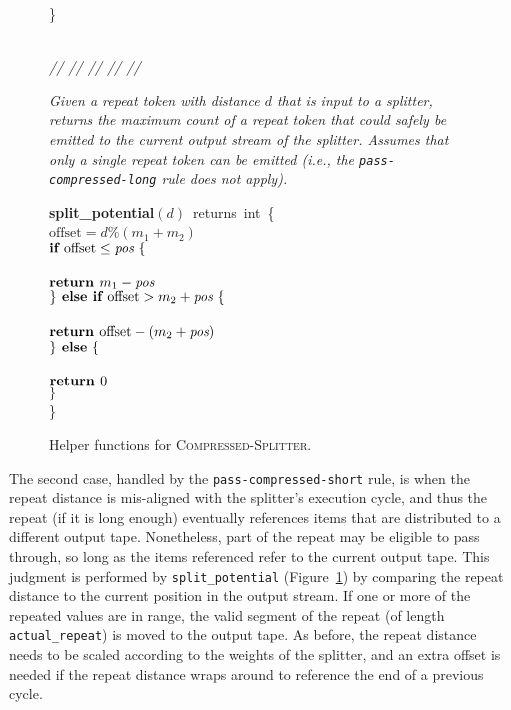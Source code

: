 \begin{figure}[t]
\}\\
~ \\
\begin{minipage}{0.1in}
\vspace{-1.75pt}
{\it // // // // //}
\end{minipage}
\begin{minipage}{3.23in}
{\it Given a repeat token with distance $d$ that is input to a
  splitter, returns the maximum count of a repeat token that could
  safely be emitted to the current output stream of the splitter.
  Assumes that only a single repeat token can be emitted (i.e., the
  {\tt pass-compressed-long} rule does not apply).}
\end{minipage}
\mbox{\bf split\_potential}$(d)$~returns~int~\{\\
\tab$\mbox{offset} = d$\%$(m_1 + m_2)$\\
\tab$\mbox{{\bf if~}} \mbox{offset} \leq \mbox{\it pos} ~\{$\\
\tab{}\\
\tab\tab$\mbox{\bf return~} m_1 - \mbox{\it pos}$\\
\tab$\} \mbox{\bf ~else if~} \mbox{offset} > m_2 + \mbox{\it pos} ~\{$\\
\tab{}\\
\tab\tab$\mbox{\bf return~} \mbox{offset} - (m_2 + \mbox{\it pos})$\\
\tab$\} \mbox{\bf ~else} ~\{$\\
\tab{}\\
\tab\tab$\mbox{\bf return~} 0$\\
\tab$\}$\\
\}
\caption{Helper functions for \textsc{Compressed-Splitter}.
\protect\label{fig:helper-splitter}}
\end{figure}

The second case, handled by the {\tt pass-compressed-short} rule, is
when the repeat distance is mis-aligned with the splitter's execution
cycle, and thus the repeat (if it is long enough) eventually
references items that are distributed to a different output tape.
Nonetheless, part of the repeat may be eligible to pass through, so
long as the items referenced refer to the current output tape.  This
judgment is performed by {\tt split\_potential}
(Figure~\ref{fig:helper-splitter}) by comparing the repeat distance to
the current position in the output stream.  If one or more of the
repeated values are in range, the valid segment of the repeat (of
length {\tt actual\_repeat}) is moved to the output tape.  As before,
the repeat distance needs to be scaled according to the weights of the
splitter, and an extra offset is needed if the repeat distance wraps
around to reference the end of a previous cycle.

